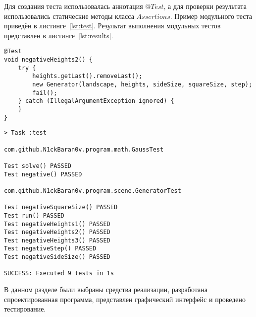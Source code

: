 Для создания теста использовалась аннотация $@Test$, а для проверки результата использовались статические методы класса $Assertions$. Пример модульного теста приведён в листинге~\ref{lst:test}.
Результат выполнения модульных тестов представлен в листинге~\ref{lst:results}.

\begin{lstlisting}[label=lst:test,caption=Пример модульного теста]
@Test
void negativeHeights2() {
	try {
		heights.getLast().removeLast();
		new Generator(landscape, heights, sideSize, squareSize, step);
		fail();
	} catch (IllegalArgumentException ignored) {
	}
}
\end{lstlisting}

\begin{lstlisting}[label=lst:results,caption=Результат выполнения модульных тестов]
> Task :test

com.github.N1ckBaran0v.program.math.GaussTest

Test solve() PASSED
Test negative() PASSED

com.github.N1ckBaran0v.program.scene.GeneratorTest

Test negativeSquareSize() PASSED
Test run() PASSED
Test negativeHeights1() PASSED
Test negativeHeights2() PASSED
Test negativeHeights3() PASSED
Test negativeStep() PASSED
Test negativeSideSize() PASSED

SUCCESS: Executed 9 tests in 1s

\end{lstlisting}


В данном разделе были выбраны средства реализации, разработана спроектированная программа, представлен графический интерфейс и проведено тестирование.